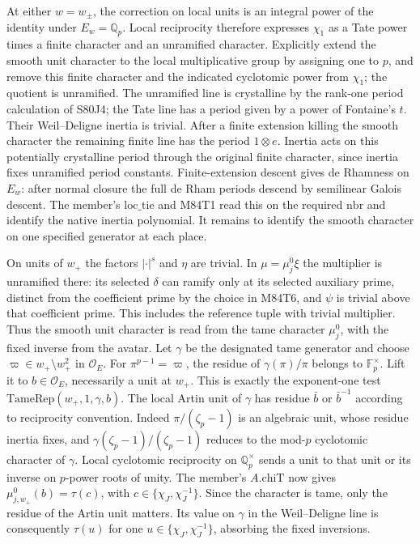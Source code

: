 At either $w=w_\pm$, the correction on local units is an integral
power of the identity under $E_w=\mathbb Q_p$. Local reciprocity
therefore expresses $\chi_1$ as a Tate power times a finite
character and an unramified character. Explicitly extend the smooth
unit character to the local multiplicative group by assigning one
to $p$, and remove this finite character and the indicated
cyclotomic power from $\chi_1$; the quotient is unramified.
The unramified line is crystalline by the rank-one period
calculation of S80J4; the Tate line has a period given by a power
of Fontaine's $t$. Their Weil--Deligne inertia is trivial.
After a finite extension killing the smooth character the remaining
finite line has the period $1\otimes e$. Inertia acts on this
potentially crystalline period through the original finite
character, since inertia fixes unramified period constants.
Finite-extension descent gives de Rhamness on $E_w$: after normal
closure the full de Rham periods descend by semilinear Galois
descent. The member's $\mathrm{loc\_tie}$ and M84T1 read this on
the required $\mathrm{nbr}$ and identify the native inertia
polynomial. It remains to identify the smooth character on one
specified generator at each place.

On units of $w_+$ the factors $|\cdot|^s$ and $\eta$ are trivial.
In $\mu=\mu^0_j\xi$ the multiplier is unramified there: its
selected $\delta$ can ramify only at its selected auxiliary prime,
distinct from the coefficient prime by the choice in M84T6, and
$\psi$ is trivial above that coefficient prime. This includes the
reference tuple with trivial multiplier. Thus the smooth unit
character is read from the tame character $\mu^0_j$, with the
fixed inverse from the avatar. Let $\gamma$ be the designated
tame generator and choose $\varpi\in w_+\setminus w_+^2$ in
$\mathcal O_E$. For $\pi^{p-1}=\varpi$, the residue of
$\gamma(\pi)/\pi$ belongs to $\mathbb F_p^\times$. Lift it to
$b\in\mathcal O_E$, necessarily a unit at $w_+$. This is exactly
the exponent-one test $\mathrm{TameRep}(w_+,1,\gamma,b)$.
The local Artin unit of $\gamma$ has residue $\bar b$ or
$\bar b^{-1}$ according to reciprocity convention. Indeed
$\pi/(\zeta_p-1)$ is an algebraic unit, whose residue inertia
fixes, and
$\gamma(\zeta_p-1)/(\zeta_p-1)$ reduces to the mod-$p$
cyclotomic character of $\gamma$. Local cyclotomic reciprocity on
$\mathbb Q_p^\times$ sends a unit to that unit or its inverse
on $p$-power roots of unity. The member's $A.\mathrm{chiT}$
now gives $\mu^0_{j,w_+}(b)=\tau(c)$, with
$c\in\{\chi_J,\chi_J^{-1}\}$. Since the character is tame, only
the residue of the Artin unit matters. Its value on $\gamma$ in
the Weil--Deligne line is consequently $\tau(u)$ for one
$u\in\{\chi_J,\chi_J^{-1}\}$, absorbing the fixed inversions.

